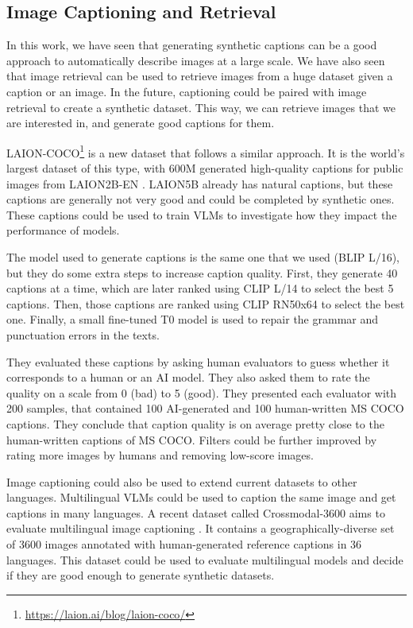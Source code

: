 \subsection{Image Captioning and Retrieval} \label{sec:image_captioning_retrieval}

In this work, we have seen that generating synthetic captions can be a good approach to automatically describe images at a large scale. We have also seen that image retrieval can be used to retrieve images from a huge dataset given a caption or an image. In the future, captioning could be paired with image retrieval to create a synthetic dataset. This way, we can retrieve images that we are interested in, and generate good captions for them.

LAION-COCO\footnote{\url{https://laion.ai/blog/laion-coco/}} is a new dataset that follows a similar approach. It is the world’s largest dataset of this type, with 600M generated high-quality captions for public images from LAION2B-EN \cite{schuhmann2022laionb}. LAION5B already has natural captions, but these captions are generally not very good and could be completed by synthetic ones. These captions could be used to train VLMs to investigate how they impact the performance of models.

The model used to generate captions is the same one that we used (BLIP L/16), but they do some extra steps to increase caption quality. First, they generate 40 captions at a time, which are later ranked using CLIP L/14 to select the best 5 captions. Then, those captions are ranked using CLIP RN50x64 to select the best one. Finally, a small fine-tuned T0 model is used to repair the grammar and punctuation errors in the texts.

They evaluated these captions by asking human evaluators to guess whether it corresponds to a human or an AI model. They also asked them to rate the quality on a scale from 0 (bad) to 5 (good). They presented each evaluator with 200 samples, that contained 100 AI-generated and 100 human-written MS COCO captions. They conclude that caption quality is on average pretty close to the human-written captions of MS COCO. Filters could be further improved by rating more images by humans and removing low-score images.

Image captioning could also be used to extend current datasets to other languages. Multilingual VLMs could be used to caption the same image and get captions in many languages. A recent dataset called Crossmodal-3600 aims to evaluate multilingual image captioning \cite{thapliyal2022crossmodal}. It contains a geographically-diverse set of 3600 images annotated with human-generated reference captions in 36 languages. This dataset could be used to evaluate multilingual models and decide if they are good enough to generate synthetic datasets.

